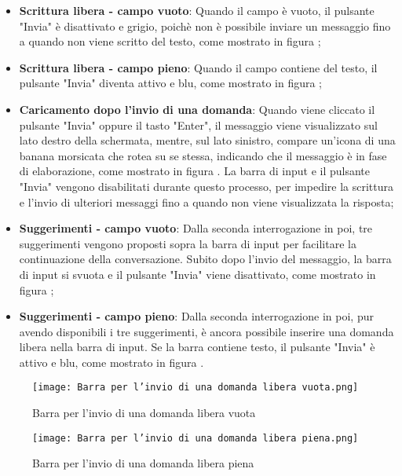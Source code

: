 \begin{itemize}  
    \item \textbf{Scrittura libera - campo vuoto}: Quando il campo è vuoto, il pulsante "Invia" è disattivato e grigio, poichè non è possibile inviare un messaggio fino a quando non viene scritto del testo, come mostrato in figura ;
    \item \textbf{Scrittura libera - campo pieno}: Quando il campo contiene del testo, il pulsante "Invia" diventa attivo e blu, come mostrato in figura ;
    \item \textbf{Caricamento dopo l'invio di una domanda}: Quando viene cliccato il pulsante "Invia" oppure il tasto "Enter", il messaggio viene visualizzato sul lato destro della schermata, mentre, sul lato sinistro, compare un'icona di una banana morsicata che rotea su se stessa, indicando che il messaggio è in fase di elaborazione, come mostrato in figura . La barra di input e il pulsante "Invia" vengono disabilitati durante questo processo, per impedire la scrittura e l'invio di ulteriori messaggi fino a quando non viene visualizzata la risposta;
    \item \textbf{Suggerimenti - campo vuoto}: Dalla seconda interrogazione in poi, tre suggerimenti vengono proposti sopra la barra di input per facilitare la continuazione della conversazione. Subito dopo l'invio del messaggio, la barra di input si svuota e il pulsante "Invia" viene disattivato, come mostrato in figura ;
    \item \textbf{Suggerimenti - campo pieno}: Dalla seconda interrogazione in poi, pur avendo disponibili i tre suggerimenti, è ancora possibile inserire una domanda libera nella barra di input. Se la barra contiene testo, il pulsante "Invia" è attivo e blu, come mostrato in figura .
\end{itemize}

\begin{figure}[h]
    \centering
        \texttt{[image: Barra per l'invio di una domanda libera vuota.png]}
        \caption{Barra per l'invio di una domanda libera vuota}
        \label{fig:Barra per l'invio di una domanda libera vuota}        
\end{figure}
\begin{figure}[h]
    \centering
        \texttt{[image: Barra per l'invio di una domanda libera piena.png]}
        \caption{Barra per l'invio di una domanda libera piena}
        \label{fig:Barra per l'invio di una domanda libera piena}        
\end{figure}

